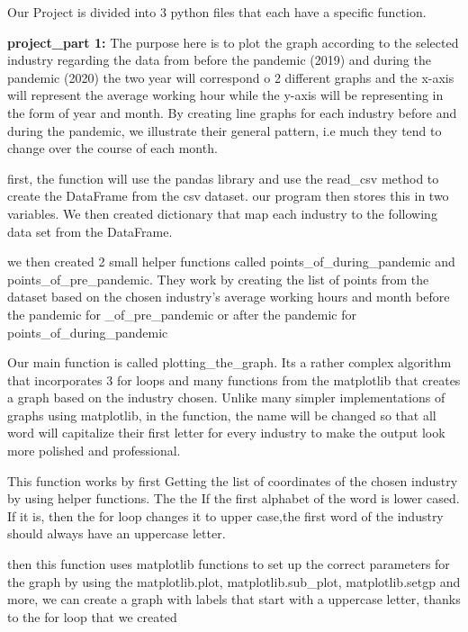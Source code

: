 \documentclass[fontsize=11pt]{article}
\begin{document}
Our Project is divided into 3 python files that each have a specific function.

\medskip   

\textbf{project\_part 1:} The purpose here is to plot the graph according to the selected industry regarding the data from before the pandemic (2019) and during the pandemic (2020) the two year will correspond o 2 different graphs and the x-axis will represent the average working hour while the y-axis
will be representing in the form of year and month. By creating line graphs for each industry before and during the pandemic, we illustrate their general pattern, i.e  much they tend to change over the course of each month. 

\medskip 


first, the function will use the pandas library and use the read\_csv method to create the DataFrame from the csv dataset. our program then stores this in
two variables.
We then created dictionary that map each industry  to the following data set from the DataFrame.


we then created 2 small helper functions called points\_of\_during\_pandemic
and points\_of\_pre\_pandemic. They work by creating the list of points from the dataset based on the chosen industry's average working hours and month before the pandemic for \_of\_pre\_pandemic or after the pandemic for points\_of\_during\_pandemic

Our main function is called plotting\_the\_graph. Its a rather complex algorithm that incorporates 3 for loops and many functions from the matplotlib that creates a graph based on the industry chosen. Unlike many simpler implementations of graphs using matplotlib, in the function, the name will be changed so that all word will capitalize their first letter for every industry to make the output look more polished and professional.

This function works by first Getting the list of coordinates of the chosen industry by using helper functions. The the If the first alphabet of the word is lower cased. If it is, then the for loop changes it to upper case,the first word of the industry should always have an uppercase letter.


then this function uses matplotlib functions to set up the correct parameters for the graph by using the matplotlib.plot, matplotlib.sub\_plot, matplotlib.setgp and more, we can create a graph with labels that start with a uppercase letter, thanks to the for loop that we created
\end{document}
